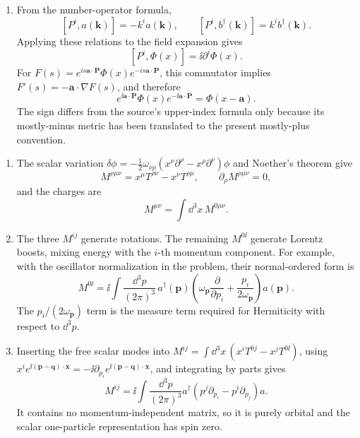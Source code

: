 \begin{enumerate}
\begin{enumerate}
state has four-momentum \(k_1^\mu+k_2^\mu\).
\item
From the number-operator formula,
\[
 [P^i,a(\mathbf k)]=-k^i a(\mathbf k),\qquad
 [P^i,b^\dagger(\mathbf k)]=k^i b^\dagger(\mathbf k).
\]
Applying these relations to the field expansion gives
\[
 [P^i,\Phi(x)]=\ii\partial^i\Phi(x).
\]
For \(F(s)=e^{is\mathbf a\cdot\mathbf P}
\Phi(x)e^{-is\mathbf a\cdot\mathbf P}\), this commutator implies
\(F'(s)=-\mathbf a\cdot\nabla F(s)\), and therefore
\[
 e^{\ii\mathbf a\cdot\mathbf P}\Phi(x)
 e^{-\ii\mathbf a\cdot\mathbf P}=\Phi(x-\mathbf a).
\]
The sign differs from the source's upper-index formula only because its
mostly-minus metric has been translated to the present mostly-plus
convention.
\end{enumerate}

\begin{enumerate}
\item
The scalar variation
\(\delta\phi=-\tfrac12\omega_{\nu\rho}
(x^\nu\partial^\rho-x^\rho\partial^\nu)\phi\)
and Noether's theorem give
\[
 M^{\rho\mu\nu}=x^\mu T^{\rho\nu}-x^\nu T^{\rho\mu},
 \qquad \partial_\rho M^{\rho\mu\nu}=0,
\]
and the charges are
\[
 M^{\mu\nu}=\int \dd^3x\,M^{0\mu\nu}.
\]
\item
The three \(M^{ij}\) generate rotations.  The remaining \(M^{0\ii}\)
generate Lorentz boosts, mixing energy with the \(i\)-th momentum
component.  For example, with the oscillator normalization in the
problem, their normal-ordered form is
\[
 M^{0\ii}=
 \ii\int\frac{\dd^3p}{(2\pi)^3}\,
 a^\dagger(\mathbf p)
 \left(\omega_{\mathbf p}\frac{\partial}{\partial p_i}
 +\frac{p_i}{2\omega_{\mathbf p}}\right)a(\mathbf p).
\]
The \(p_i/(2\omega_{\mathbf p})\) term is the measure term required for
Hermiticity with respect to \(\dd^3p\).
\item
Inserting the free scalar modes into
\(M^{ij}=\int \dd^3x\,(x^iT^{0j}-x^jT^{0\ii})\), using
\(x^i e^{\ii(\mathbf p-\mathbf q)\cdot\mathbf x}
=-\ii\partial_{p_i}e^{\ii(\mathbf p-\mathbf q)\cdot\mathbf x}\), and
integrating by parts gives
\[
 M^{ij}=\ii\int\frac{\dd^3p}{(2\pi)^3}a^\dagger
 \left(p^j\partial_{p_i}-p^i\partial_{p_j}\right)a.
\]
It contains no momentum-independent matrix, so it is purely orbital and
the scalar one-particle representation has spin zero.
\end{enumerate}


\end{enumerate}
